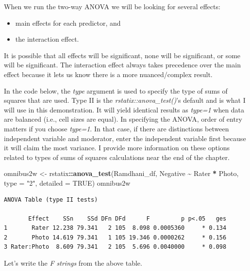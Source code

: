\documentclass[
  11pt,
]{book}
\newenvironment{Shaded}{\begin{snugshade}}{\end{snugshade}}
\newcommand{\AttributeTok}[1]{\textcolor[rgb]{0.27,0.27,0.27}{#1}}
\newcommand{\ConstantTok}[1]{\textcolor[rgb]{0.37,0.37,0.37}{#1}}
\newcommand{\FunctionTok}[1]{\textcolor[rgb]{0.27,0.27,0.27}{\textbf{#1}}}
\newcommand{\NormalTok}[1]{#1}
\newcommand{\OtherTok}[1]{\textcolor[rgb]{0.37,0.37,0.37}{#1}}
\newcommand{\SpecialCharTok}[1]{\textcolor[rgb]{0.43,0.43,0.43}{\textbf{#1}}}
\newcommand{\StringTok}[1]{\textcolor[rgb]{0.5,0.5,0.5}{#1}}
\providecommand{\tightlist}{%
  \setlength{\itemsep}{0pt}\setlength{\parskip}{0pt}}
\begin{document}
When we run the two-way ANOVA we will be looking for several effects:

\begin{itemize}
\tightlist
\item
  main effects for each predictor, and
\item
  the interaction effect.
\end{itemize}

It is possible that all effects will be significant, none will be significant, or some will be significant. The interaction effect always takes precedence over the main effect because it lets us know there is a more nuanced/complex result.

In the code below, the \emph{type} argument is used to specify the type of sums of squares that are used. Type II is the \emph{rstatix::anova\_test()}'s default and is what I will use in this demonstration. It will yield identical results as \emph{type=1} when data are balanced (i.e., cell sizes are equal). In specifying the ANOVA, order of entry matters if you choose \emph{type=1}. In that case, if there are distinctions between independent variable and moderator, enter the independent variable first because it will claim the most variance. I provide more information on these options related to types of sums of squares calculations near the end of the chapter.

\begin{Shaded}
\begin{Highlighting}[]
\NormalTok{omnibus2w }\OtherTok{\textless{}{-}}\NormalTok{ rstatix}\SpecialCharTok{::}\FunctionTok{anova\_test}\NormalTok{(Ramdhani\_df, Negative }\SpecialCharTok{\textasciitilde{}}\NormalTok{ Rater }\SpecialCharTok{*}\NormalTok{ Photo,}
    \AttributeTok{type =} \StringTok{"2"}\NormalTok{, }\AttributeTok{detailed =} \ConstantTok{TRUE}\NormalTok{)}
\NormalTok{omnibus2w}
\end{Highlighting}
\end{Shaded}

\begin{verbatim}
ANOVA Table (type II tests)

       Effect    SSn    SSd DFn DFd      F         p p<.05   ges
1       Rater 12.238 79.341   2 105  8.098 0.0005360     * 0.134
2       Photo 14.619 79.341   1 105 19.346 0.0000262     * 0.156
3 Rater:Photo  8.609 79.341   2 105  5.696 0.0040000     * 0.098
\end{verbatim}

Let's write the \emph{F strings} from the above table.
\end{document}
